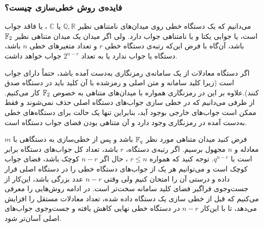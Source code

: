  \subsubsection*{فایده‌ی روش خطی‌سازی چیست؟}
 می‌دانیم که یک دستگاه خطی روی میدان‌های نامتناهی نظیر 
 $\mathbb{Q}, \mathbb{R}$
 یا 
 $\mathbb{C}$
 ، یا فاقد جواب است، یا جوابی یکتا و یا نامتناهی جواب دارد. ولی اگر میدان یک میدان متناهی نظیر 
 $\mathbb{F}_{2}$
 باشد، آن‌گاه با فرض این‌که رتبه‌ی دستگاه خطی 
 $r$
 و تعداد متغیر‌های خطی 
 $n$
 باشد، دستگاه یا جواب ندارد یا به تعداد 
 $2^{n - r}$
 جواب خواهد داشت. 
 
 اگر دستگاه معادلات از یک سامانه‌ی رمزنگاری به‌دست  آمده باشد، حتماً دارای جواب است (زیرا کلید سامانه و متن اصلی و رمزشده با آن کلید باید در دستگاه صدق کنند).علاوه بر این در رمزنگاری همواره با میدان‌های متناهی به خصوص 
 $\mathbb{F}_{2}$
 کار می‌کنیم. از طرفی می‌دانیم که  در خطی سازی جواب‌های دستگاه اصلی  حذف نمی‌شوند و فقط ممکن است جواب‌های خارجی بوجود آید، بنابراین تنها یک حالت برای دستگاه‌های خطی به‌دست  آمده در رمزنگاری وجود دارد و آن متناهی بودن فضای جواب دستگاه است. 
 
 فرض کنید میدان متناهی مورد نظر 
 $\mathbb{F}_{q}$
 باشد و پس از خطی‌سازی به دستگاهی با 
 $m$
 معادله و 
 $n$
 مجهول برسیم. اگر رتبه‌ی دستگاه، 
 $r$
 باشد، تعداد کل جواب‌های دستگاه برابر است با 
 $q^{n - r}$.
 توجه کنید که همواره 
 $r\leq n$
 ، حال اگر 
 $n - r$
 کوچک باشد، فضای جواب کوچک است و  می‌توانیم هر یک از جواب‌های دستگاه خطی را در دستگاه اصلی قرار داده و درستی آن را امتحان کنیم ولی وقتی 
 $n - r$
 عدد بزرگی باشد، این‌کار   از جست‌وجوی فراگیر فضای کلید سامانه سخت‌تر است. در ادامه روش‌هایی را معرفی می‌کنیم که قبل از خطی سازی یک دستگاه داده شده، تعداد معادلات مستقل را افزایش می‌دهد،  تا با این‌کار 
 $n - r$
 در دستگاه خطی نهایی کاهش یافته و جست‌وجوی جواب‌های اصلی آسان‌تر شود. 
 
